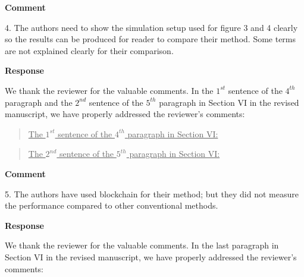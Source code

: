 \documentclass[12pt,draftcls, onecolumn]{IEEEtran}
\begin{document}
\newpage
\vspace{3mm}
\noindent\textcolor[rgb]{1.00,0.00,0.00}{\textbf{Comment}}
\vspace{3mm}

4. The authors need to show the simulation setup used for figure 3 and 4 clearly so the results can be produced for reader to compare their method. Some terms are not explained clearly for their comparison.

\vspace{3mm}
\noindent\textcolor[rgb]{0.00,0.00,1.00}{\textbf{Response}}
\vspace{3mm}

We thank the reviewer for the valuable comments. In the $1^{st}$ sentence of the $4^{th}$ paragraph and the $2^{nd}$ sentence of the $5^{th}$ paragraph in Section VI in the revised manuscript, we have properly addressed the reviewer's comments:

\begin{quote}
\underline{The $1^{st}$ sentence of the $4^{th}$ paragraph in Section VI:}
\vspace{0mm}
\end{quote}

\begin{quote}
\underline{The $2^{nd}$ sentence of the $5^{th}$ paragraph in Section VI:}
\vspace{0mm}
\end{quote}

\vspace{3mm}
\noindent\textcolor[rgb]{1.00,0.00,0.00}{\textbf{Comment}}
\vspace{3mm}

5. The authors have used blockchain for their method; but they did not measure the performance compared to other conventional methods.

\vspace{3mm}
\noindent\textcolor[rgb]{0.00,0.00,1.00}{\textbf{Response}}
\vspace{3mm}

We thank the reviewer for the valuable comments. In the last paragraph in Section VI in the revised manuscript, we have properly addressed the reviewer's comments:
\end{document}
